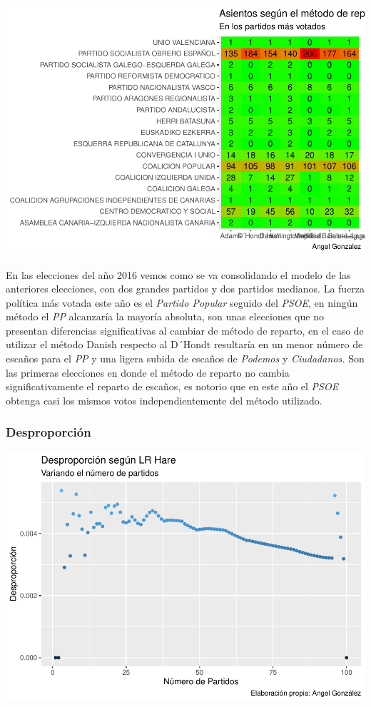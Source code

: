 \documentclass[12pt,a4paper,]{book}
\numberwithin{dummy}{section}
\theoremstyle{ocrenumbox}
\theoremstyle{blacknumex}
\theoremstyle{blacknumbox}
\theoremstyle{ocrenum}
\theoremstyle{ocrenum}
\begin{document}
\begin{center}\includegraphics[width=1\linewidth]{figurasR/unnamed-chunk-41-2} \end{center}

En las elecciones del año 2016 vemos como se va consolidando el modelo
de las anteriores elecciones, con dos grandes partidos y dos partidos
medianos. La fuerza política más votada este año es el \emph{Partido
Popular} seguido del \emph{PSOE}, en ningún método el \emph{PP}
alcanzaría la mayoría absoluta, son unas elecciones que no presentan
diferencias significativas al cambiar de método de reparto, en el caso
de utilizar el método Danish respecto al D´Hondt resultaría en un menor
número de escaños para el \emph{PP} y una ligera subida de escaños de
\emph{Podemos} y \emph{Ciudadanos.} Son las primeras elecciones en donde
el método de reparto no cambia significativamente el reparto de escaños,
es notorio que en este año el \emph{PSOE} obtenga casi los mismos votos
independientemente del método utilizado.

\hypertarget{desproporciuxf3n-12}{%
\subsubsection{Desproporción}\label{desproporciuxf3n-12}}

\begin{center}\includegraphics[width=1\linewidth]{figurasR/unnamed-chunk-42-1} \end{center}
\end{document}
